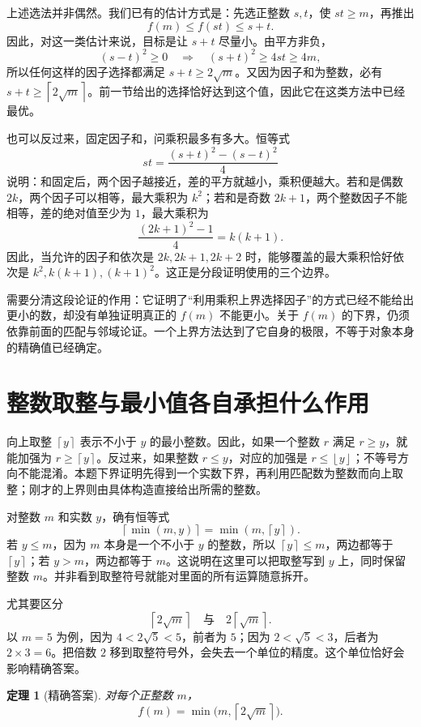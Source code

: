 \documentclass[UTF8,a4paper,oneside,openany,fontset=fandol,zihao=-4]{ctexbook}
\theoremstyle{guide}
\newtheorem{theorem}{定理}[chapter]
\newcommand{\ceil}[1]{\left\lceil#1\right\rceil}
\newcommand{\floor}[1]{\left\lfloor#1\right\rfloor}
\begin{document}
上述选法并非偶然。我们已有的估计方式是：先选正整数 $s,t$，使 $st\geq m$，再推出
\[
f(m)\leq f(st)\leq s+t.
\]
因此，对这一类估计来说，目标是让 $s+t$ 尽量小。由平方非负，
\[
(s-t)^2\geq0
\quad\Longrightarrow\quad
(s+t)^2\geq4st\geq4m,
\]
所以任何这样的因子选择都满足 $s+t\geq2\sqrt m$。又因为因子和为整数，必有 $s+t\geq\ceil{2\sqrt m}$。前一节给出的选择恰好达到这个值，因此它在这类方法中已经最优。

也可以反过来，固定因子和，问乘积最多有多大。恒等式
\[
st=\frac{(s+t)^2-(s-t)^2}{4}
\]
说明：和固定后，两个因子越接近，差的平方就越小，乘积便越大。若和是偶数 $2k$，两个因子可以相等，最大乘积为 $k^2$；若和是奇数 $2k+1$，两个整数因子不能相等，差的绝对值至少为 $1$，最大乘积为
\[
\frac{(2k+1)^2-1}{4}=k(k+1).
\]
因此，当允许的因子和依次是 $2k,2k+1,2k+2$ 时，能够覆盖的最大乘积恰好依次是 $k^2,k(k+1),(k+1)^2$。这正是分段证明使用的三个边界。

需要分清这段论证的作用：它证明了“利用乘积上界选择因子”的方式已经不能给出更小的数，却没有单独证明真正的 $f(m)$ 不能更小。关于 $f(m)$ 的下界，仍须依靠前面的匹配与邻域论证。一个上界方法达到了它自身的极限，不等于对象本身的精确值已经确定。

\section{整数取整与最小值各自承担什么作用}

向上取整 $\ceil y$ 表示不小于 $y$ 的最小整数。因此，如果一个整数 $r$ 满足 $r\geq y$，就能加强为 $r\geq\ceil y$。反过来，如果整数 $r\leq y$，对应的加强是 $r\leq\floor y$；不等号方向不能混淆。本题下界证明先得到一个实数下界，再利用匹配数为整数而向上取整；刚才的上界则由具体构造直接给出所需的整数。

对整数 $m$ 和实数 $y$，确有恒等式
\begin{equation}\label{rnd:min-ceiling}
\ceil{\min(m,y)}=\min(m,\ceil y).
\end{equation}
若 $y\leq m$，因为 $m$ 本身是一个不小于 $y$ 的整数，所以 $\ceil y\leq m$，两边都等于 $\ceil y$；若 $y>m$，两边都等于 $m$。这说明在这里可以把取整写到 $y$ 上，同时保留整数 $m$。并非看到取整符号就能对里面的所有运算随意拆开。

尤其要区分
\[
\ceil{2\sqrt m}
\quad\text{与}\quad
2\ceil{\sqrt m}.
\]
以 $m=5$ 为例，因为 $4<2\sqrt5<5$，前者为 $5$；因为 $2<\sqrt5<3$，后者为 $2\times3=6$。把倍数 $2$ 移到取整符号外，会失去一个单位的精度。这个单位恰好会影响精确答案。

\begin{theorem}[精确答案]\label{rnd:exact-answer}
对每个正整数 $m$，
\[
\boxed{f(m)=\min\bigl(m,\ceil{2\sqrt m}\bigr).}
\]
\end{theorem}
\end{document}
